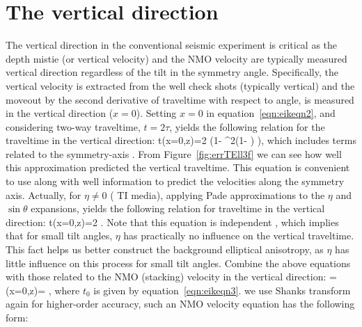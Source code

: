 \section{The vertical direction}

The vertical direction in the conventional seismic experiment
 is critical as the depth mistie (or vertical velocity) and the NMO velocity are typically measured   vertical direction
regardless of the tilt in the symmetry angle. Specifically, the vertical velocity is extracted from the well check shots (typically vertical) and the moveout
 by the second derivative of traveltime with respect to  angle, is
measured in the vertical direction ($x=0$). 
Setting $x=0$ in equation~\ref{eqn:eikeqn2}, and considering
 two-way traveltime, $t=2\tau$,
 yields the following relation for the traveltime in the vertical direction:
\beqa
t(x=0,z)=2  \left(1- \sin^{2}\theta \left(1- \right) \right),
\label{eqn:eikeqn3}
\eeqa
which  includes terms related to the symmetry-axis . From Figure~\ref{fig:errTEll3f} we can see how well this
approximation predicted the vertical traveltime. This equation is convenient to use along with
well information to predict the velocities along the symmetry
axis. Actually, for $\eta \ne 0$  ( TI media), 
applying Pade approximations \cite[]{Bender} to the $\eta$ and $\sin\theta$ expansions, yields the following relation for traveltime in the vertical direction:
\beqa
t(x=0,z)=2  .
\label{eqn:eikeqn4}
\eeqa
Note that this equation is independent , which implies that for small tilt angles, $\eta$ has practically no influence on the 
vertical traveltime.
This fact helps us  better construct the background
elliptical anisotropy, as $\eta$ has little influence on this process
for small tilt angles. Combine the above equations with those related to the 
NMO (stacking) velocity in the vertical direction:
\beqa
{} =  (x=0,z)= 
	,
\label{eqn:eikeqn5}
\eeqa
where $t_0$ is given by equation~\ref{eqn:eikeqn3}.
  we use Shanks transform again for higher-order accuracy, such an NMO velocity equation has the following form:
